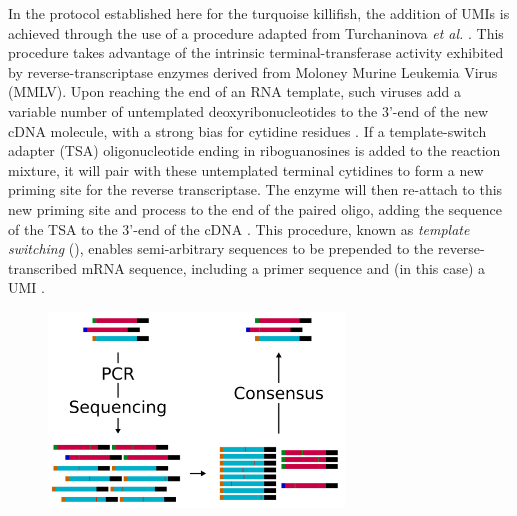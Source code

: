 In the \igseq protocol established here for the turquoise killifish, the addition of UMIs is achieved through the use of a procedure adapted from Turchaninova \textit{et al.} \parencite{turchaninova2016igprep}. This procedure takes advantage of the intrinsic terminal-transferase activity exhibited by reverse-transcriptase enzymes derived from Moloney Murine Leukemia Virus (MMLV). Upon reaching the end of an RNA template, such viruses add a variable number of untemplated deoxyribonucleotides to the 3'-end of the new cDNA molecule, with a strong bias for cytidine residues \parencite{zajac2013switching}. If a template-switch adapter (TSA) oligonucleotide ending in riboguanosines is added to the reaction mixture, it will pair with these untemplated terminal cytidines to form a new priming site for the reverse transcriptase. The enzyme will then re-attach to this new priming site and process to the end of the paired oligo, adding the sequence of the TSA to the 3'-end of the cDNA \parencite{zajac2013switching}. This procedure, known as \textit{template switching} (), enables semi-arbitrary sequences to be prepended to the reverse-transcribed mRNA sequence, including a primer sequence and (in this case) a UMI \parencite{turchaninova2016igprep}.

\begin{figure}
\centering
\includegraphics[width=0.7\textwidth]{_Figures/png_edited/umi-consensus-schema}
\label{fig:umi-consensus-schema}
\end{figure}

